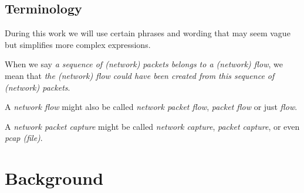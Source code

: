 \documentclass[
	ngerman,
	ruledheaders=section,%
	class=report,%
	thesis={type=bachelor},%
	accentcolor=9c,%
	custommargins=true,%
	marginpar=false,%
	parskip=half-,%
	fontsize=11pt,%
]{tudapub}
\begin{document}
\section{Terminology}
During this work we will use certain phrases and wording that may seem vague but simplifies more complex expressions.

When we say \textit{a sequence of (network) packets belongs to a (network) flow}, we mean that \textit{the (network) flow could have been created from this sequence of (network) packets}.

A \textit{network flow} might also be called \textit{network packet flow}, \textit{packet flow} or just \textit{flow}.

A \textit{network packet capture} might be called \textit{network capture}, \textit{packet capture}, or even \textit{pcap (file)}.

\chapter{Background}


%
%
\end{document}
